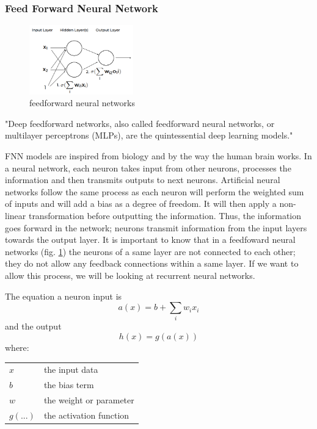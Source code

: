 \documentclass[6pt,letter]{article}\usepackage[]{graphicx}\usepackage[]{color}
\makeatletter
\newenvironment{conditions}
  {\par\vspace{\abovedisplayskip}\noindent\begin{tabular}{>{$}l<{$} @{${}={}$} l}}
  {\end{tabular}\par\vspace{\belowdisplayskip}}
\makeatother
\begin{document}
\subsubsection{Feed Forward Neural Network}
\begin{figure}
  \begin{center}
    \includegraphics[width=0.4\textwidth]{feedforward_neural_networks.png}
  \end{center}
  \caption{feedforward neural networks}
  \label{fig:attention}
\end{figure}

"Deep feedforward networks, also called feedforward neural networks, or multilayer perceptrons (MLPs), are the quintessential deep learning models." \cite{Goodfellow-et-al-2016}

\ac{FNN} models are inspired from biology and by the way the human brain works. In a neural network, each neuron takes input from other neurons, processes the information and then transmits outputs to next neurons. Artificial neural networks follow the same process as each neuron will perform the weighted sum of inputs and will add a bias as a degree of freedom. It will then apply a non-linear transformation before outputting the information. Thus, the information goes forward in the network; neurons transmit information from the input layers towards the output layer. It is important to know that in a feedfoward neural networks (fig. \ref{fig:attention}) the neurons of a same layer are not connected to each other; they do not allow any feedback connections within a same layer. If we want to allow this process, we will be looking at recurrent neural networks.

The equation a neuron input is  
\begin{equation}
a(x) = b +\sum_{i}{w_i x_i}
\end{equation}
and the output
\begin{equation}
h(x) = g(a(x))
\end{equation}
where:
\begin{conditions}
 x     &  the input data \\
 b     &  the bias term \\
 w     &  the weight or parameter \\   
 g(...) &  the activation function
\end{conditions}
\end{document}
